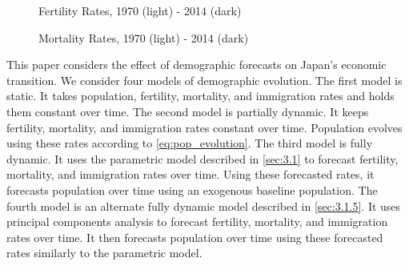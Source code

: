 \documentclass[10pt]{article}
\renewcommand{\thesection}{\arabic{section}}
\renewcommand{\section}[2][]{\oldsection[#1]{#2}\index{#1}\label{sec:\thesection}}
\numberwithin{equation}{subsection}
\newcommand*{\FigureDir}{../../graphs}
\begin{document}
\begin{figure}[!ht]
   \centering
   \caption{\label{fig:fert_data}Fertility Rates, 1970 (light) - 2014 (dark)}
\end{figure}

\begin{figure}[!ht]
   \centering
   \caption{\label{fig:mort_data}Mortality Rates, 1970 (light) - 2014 (dark)}
\end{figure}





\section{Model}

\par This paper considers the effect of demographic forecasts on Japan's economic transition. We consider four models of demographic evolution. The first model is static. It takes population, fertility, mortality, and immigration rates and holds them constant over time. The second model is partially dynamic. It keeps fertility, mortality, and immigration rates constant over time. Population evolves using these rates according to \ref{eq:pop_evolution}. The third model is fully dynamic. It uses the parametric model described in \autoref{sec:3.1} to forecast fertility, mortality, and immigration rates over time. Using these forecasted rates, it forecasts population over time using an exogenous baseline population. The fourth model is an alternate fully dynamic model described in \autoref{sec:3.1.5}. It uses principal components analysis to forecast fertility, mortality, and immigration rates over time. It then forecasts population over time using these forecasted rates similarly to the parametric model.
\end{document}
